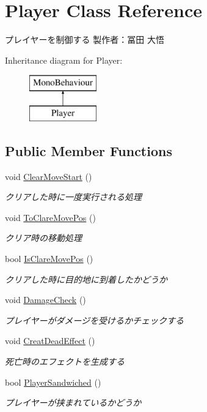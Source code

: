 \hypertarget{class_player}{}\section{Player Class Reference}
\label{class_player}


プレイヤーを制御する 製作者：冨田 大悟  


Inheritance diagram for Player\+:\begin{figure}[H]
\begin{center}
\leavevmode
\includegraphics[height=2.000000cm]{class_player}
\end{center}
\end{figure}
\subsection*{Public Member Functions}
\begin{DoxyCompactItemize}
\item 
void \hyperlink{class_player_aa4f5ff678bbdc84d859a144aca0975db}{Clear\+Move\+Start} ()
\begin{DoxyCompactList}\small\item\em クリアした時に一度実行される処理 \end{DoxyCompactList}\item 
void \hyperlink{class_player_ae225a525cb56847f919b5b6342233f97}{To\+Clare\+Move\+Pos} ()
\begin{DoxyCompactList}\small\item\em クリア時の移動処理 \end{DoxyCompactList}\item 
bool \hyperlink{class_player_a2aacc7413713cf79b529a0a9965ea3d8}{Is\+Clare\+Move\+Pos} ()
\begin{DoxyCompactList}\small\item\em クリアした時に目的地に到着したかどうか \end{DoxyCompactList}\item 
void \hyperlink{class_player_a61abc629af38a106fcb7cd94ac0dff45}{Damage\+Check} ()
\begin{DoxyCompactList}\small\item\em プレイヤーがダメージを受けるかチェックする \end{DoxyCompactList}\item 
void \hyperlink{class_player_ae737f5c0952f352da117d07cce727e6d}{Creat\+Dead\+Effect} ()
\begin{DoxyCompactList}\small\item\em 死亡時のエフェクトを生成する \end{DoxyCompactList}\item 
bool \hyperlink{class_player_a54be273b0cd99bf5f3ee8825bd8bc943}{Player\+Sandwiched} ()
\begin{DoxyCompactList}\small\item\em プレイヤーが挟まれているかどうか \end{DoxyCompactList}\end{DoxyCompactItemize}

